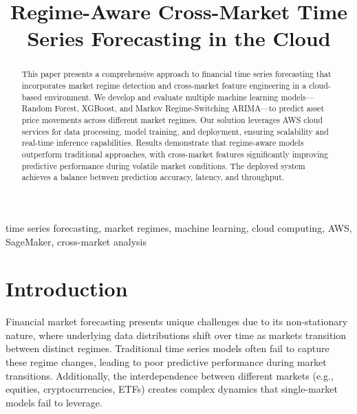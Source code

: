 \documentclass[conference]{IEEEtran}
\begin{document}
\title{Regime-Aware Cross-Market Time Series Forecasting in the Cloud\\
}

\author{
\and
{}
\and
{}
}

\maketitle

\begin{abstract}
This paper presents a comprehensive approach to financial time series forecasting that incorporates market regime detection and cross-market feature engineering in a cloud-based environment. We develop and evaluate multiple machine learning models—Random Forest, XGBoost, and Markov Regime-Switching ARIMA—to predict asset price movements across different market regimes. Our solution leverages AWS cloud services for data processing, model training, and deployment, ensuring scalability and real-time inference capabilities. Results demonstrate that regime-aware models outperform traditional approaches, with cross-market features significantly improving predictive performance during volatile market conditions. The deployed system achieves a balance between prediction accuracy, latency, and throughput.
\end{abstract}

\begin{IEEEkeywords}
time series forecasting, market regimes, machine learning, cloud computing, AWS, SageMaker, cross-market analysis
\end{IEEEkeywords}

\section{Introduction}
Financial market forecasting presents unique challenges due to its non-stationary nature, where underlying data distributions shift over time as markets transition between distinct regimes. Traditional time series models often fail to capture these regime changes, leading to poor predictive performance during market transitions. Additionally, the interdependence between different markets (e.g., equities, cryptocurrencies, ETFs) creates complex dynamics that single-market models fail to leverage.
\end{document}
